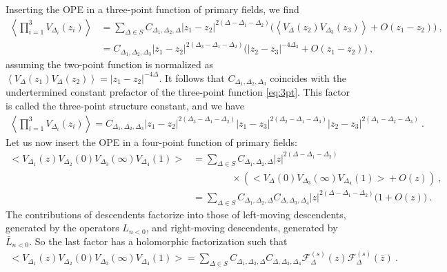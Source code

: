 \documentclass[12pt, a4paper]{article}
\theoremstyle{break}
\begin{document}
Inserting the OPE in a three-point function of primary fields, we find 
\begin{align}
 \left<\prod_{i=1}^3 V_{\Delta_i}(z_i) \right> & = \sum_{\Delta\in S}C_{\Delta_1,\Delta_2,\Delta} |z_1-z_2|^{2(\Delta-\Delta_1-\Delta_2)}
 \Big(\left< V_{\Delta}(z_2) V_{\Delta_3}(z_3) \right> +O(z_1-z_2)\Big) \ ,
 \\
& =  C_{\Delta_1,\Delta_2,\Delta_3} |z_1-z_2|^{2(\Delta_3-\Delta_1-\Delta_2)} \Big( |z_2-z_3|^{-4\Delta_3} + O(z_1-z_2)\Big)\ ,
\end{align}
assuming the two-point function is normalized as $\left< V_{\Delta}(z_1)V_{\Delta}(z_2) \right> = |z_1-z_2|^{-4\Delta}$.
It follows that $C_{\Delta_1,\Delta_2,\Delta_3}$ coincides with the undertermined constant prefactor of the three-point function \eqref{eq:3pt}. This factor is called the three-point structure constant, and we have
\begin{align}
 \left<\prod_{i=1}^3 V_{\Delta_i}(z_i) \right> = C_{\Delta_1,\Delta_2,\Delta_3} |z_1-z_2|^{2(\Delta_3-\Delta_1-\Delta_2)} |z_1-z_3|^{2(\Delta_2-\Delta_1-\Delta_3)} |z_2-z_3|^{2(\Delta_1-\Delta_2-\Delta_3)}\ .
\end{align}
Let us now insert the OPE in a four-point function of primary fields:
\begin{align}
 \Big<V_{\Delta_1}(z)V_{\Delta_2}(0)V_{\Delta_3}(\infty)V_{\Delta_4}(1)\Big>
 &= \sum_{\Delta\in S} C_{\Delta_1,\Delta_2,\Delta} |z|^{2(\Delta-\Delta_1-\Delta_2)}
 \nonumber
\\ & \qquad \qquad \times 
 \left(\Big< V_\Delta(0)V_{\Delta_3}(\infty)V_{\Delta_4}(1)\Big> + O(z)\right) \ ,
 \\
 &=  \sum_{\Delta\in S} C_{\Delta_1,\Delta_2,\Delta} C_{\Delta,\Delta_3,\Delta_4}
|z|^{2(\Delta-\Delta_1-\Delta_2)} \Big(1 +O(z) \Big)\ .
\end{align}
The contributions of descendents factorize into those of left-moving descendents, generated by the operators $L_{n<0}$, and right-moving descendents, generated by $\bar L_{n<0}$. So the last factor has a holomorphic factorization such that 
\begin{align}
\Big<V_{\Delta_1}(z)V_{\Delta_2}(0)V_{\Delta_3}(\infty)V_{\Delta_4}(1)\Big>
 =\sum_{\Delta\in S} C_{\Delta_1,\Delta_2,\Delta} C_{\Delta,\Delta_3,\Delta_4}  \mathcal{F}^{(s)}_\Delta(z) \mathcal{F}^{(s)}_\Delta(\bar z)\ .
 \label{sdec}
\end{align}
\end{document}
